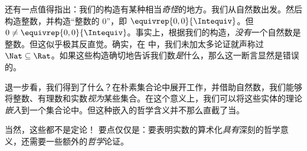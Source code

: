 \documentclass[../../../include/open-logic-section]{subfiles}
\begin{document}
还有一点值得指出：我们的构造有某种相当\emph{奇怪}的地方。我们从自然数出发。然后构造整数，并构造“整数的 $0$”，即 $ \equivrep{0,0}{\Intequiv}$。但 $0 \neq
\equivrep{0,0}{\Intequiv}$。事实上，根据我们的构造，\emph{没有}一个自然数是整数。但这似乎极其反直觉。确实，在  中，我们未加太多论证就声称过 $\Nat \subseteq \Rat$。如果这些构造确切地告诉我们数\emph{是}什么，那么这一断言显然是错误的。

退一步看，我们得到了什么？在朴素集合论中展开工作，并借助自然数，我们能够将整数、有理数和实数\emph{视为}某些集合。在这个意义上，我们可以将这些实体的理论\emph{嵌入}到一个集合论中。但这种嵌入的哲学含义并不那么直截了当。

当然，这些都不是定论！{} 要点仅仅是：要表明实数的算术化\emph{具有}深刻的哲学意义，还需要一些额外的\emph{哲学}论证。

\end{document}
